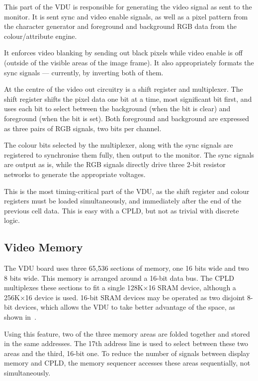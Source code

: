 This part of the VDU is responsible for generating the video signal as sent to
the monitor. It is sent sync and video enable signals, as well as a pixel
pattern from the character generator and foreground and background RGB data
from the colour/attribute engine.

It enforces video blanking by sending out black pixels while video enable is
off (outside of the visible areas of the image frame). It also appropriately
formats the sync signals — currently, by inverting both of them.

At the centre of the video out circuitry is a shift register and
multiplexer. The shift register shifts the pixel data one bit at a time, most
significant bit first, and uses each bit to select between the background (when
the bit is clear) and foreground (when the bit is set). Both foreground and
background are expressed as three pairs of RGB signals, two bits per
channel.

The colour bits selected by the multiplexer, along with the sync signals are
registered to synchronise them fully, then output to the monitor. The sync
signals are output as is, while the RGB signals directly drive three 2-bit
resistor networks to generate the appropriate voltages.

This is the most timing-critical part of the VDU, as the shift register and
colour registers must be loaded simultaneously, and immediately after the end
of the previous cell data. This is easy with a CPLD, but not as trivial with
discrete logic.



\subsection{Video Memory}
\label{sec:vdu:memory-org}

The VDU board uses three 65,536 sections of memory, one 16 bits wide and two 8
bits wide. This memory is arranged around a 16-bit data bus. The CPLD
multiplexes these sections to fit a single 128K×16 SRAM device, although a
256K×16 device is used. 16-bit SRAM devices may be operated as two disjoint
8-bit devices, which allows the VDU to take better advantage of the space, as
shown in~.

Using this feature, two of the three memory areas are folded together and
stored in the same addresses. The 17th address line is used to select between
these two areas and the third, 16-bit one. To reduce the number of signals
between display memory and CPLD, the memory sequencer accesses these areas
sequentially, not simultaneously.

